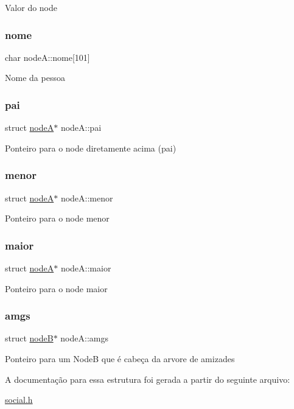 Valor do node \mbox{\label{structnodeA_abb21dead329c9c152aaf2544337b26d7}} 
\subsubsection{\texorpdfstring{nome}{nome}}
{\footnotesize\ttfamily char node\+A\+::nome\mbox{[}101\mbox{]}}

Nome da pessoa \mbox{\label{structnodeA_a0ff9bb5e43589704c3ce4eb4434d76af}} 
\subsubsection{\texorpdfstring{pai}{pai}}
{\footnotesize\ttfamily struct \mbox{\hyperlink{structnodeA}{nodeA}}$\ast$ node\+A\+::pai}

Ponteiro para o node diretamente acima (pai) \mbox{\label{structnodeA_a240c2a666e348701276be151d0dc6f9a}} 
\subsubsection{\texorpdfstring{menor}{menor}}
{\footnotesize\ttfamily struct \mbox{\hyperlink{structnodeA}{nodeA}}$\ast$ node\+A\+::menor}

Ponteiro para o node menor \mbox{\label{structnodeA_af3a6276035abe3f5912b42d5334b84f2}} 
\subsubsection{\texorpdfstring{maior}{maior}}
{\footnotesize\ttfamily struct \mbox{\hyperlink{structnodeA}{nodeA}}$\ast$ node\+A\+::maior}

Ponteiro para o node maior \mbox{\label{structnodeA_a618b5972693f9ff48d59387eced6eb09}} 
\subsubsection{\texorpdfstring{amgs}{amgs}}
{\footnotesize\ttfamily struct \mbox{\hyperlink{structnodeB}{nodeB}}$\ast$ node\+A\+::amgs}

Ponteiro para um NodeB que é cabeça da arvore de amizades 

A documentação para essa estrutura foi gerada a partir do seguinte arquivo\+:\begin{DoxyCompactItemize}
\item 
\mbox{\hyperlink{social_8h}{social.\+h}}\end{DoxyCompactItemize}
